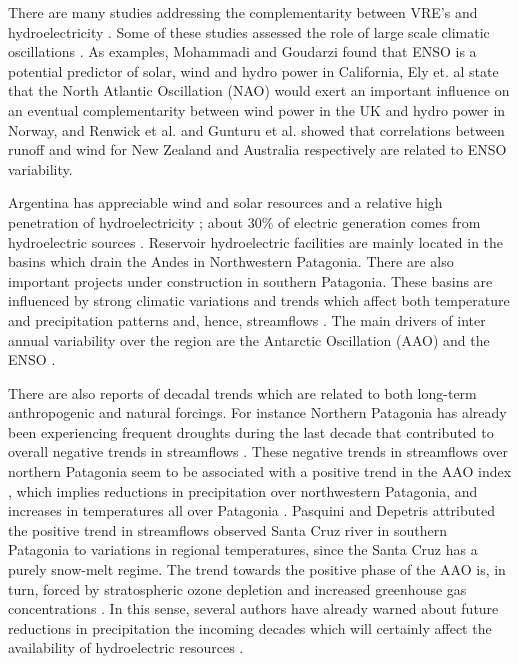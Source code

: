 \documentclass[AMA,Times1COL]{WileyNJDv5} %
\begin{document}
\begin{linenumbers}
There are many studies addressing the complementarity between VRE's and hydroelectricity \cite{rego2016positive, barbosa2017hydro, jurasz2020review, ciria2020multi}. Some of these studies assessed the role of large scale climatic oscillations  \cite{pozo2011impact,gunturu2017asynchrony, franccois2016influence}. As examples, Mohammadi and Goudarzi \cite{mohammadi2018study} found that ENSO is a potential predictor of solar, wind and hydro power in California, Ely et. al \cite{ely2013implications} state that the North Atlantic Oscillation (NAO) would exert an important influence on an eventual complementarity between wind power in the UK and hydro power in Norway, and Renwick et al. and Gunturu et al. \cite{renwick2010effects, gunturu2017asynchrony} showed that correlations between runoff and wind for New Zealand and Australia respectively are related to ENSO variability.

Argentina has appreciable wind and solar resources and a relative high penetration of hydroelectricity \cite{de2007renewable, lu2017global}; about 30\% of electric generation comes from hydroelectric sources \cite{barbosa2017hydro}. Reservoir hydroelectric facilities are mainly located in the basins which drain the Andes in Northwestern Patagonia. There are also important projects under construction in southern Patagonia. These basins are influenced by strong climatic variations and trends which affect both temperature and precipitation patterns and, hence, streamflows \cite{seoane2007assessing, garreaud2009present, gonzalez2010statistical, garreaud2013large}. The main drivers of inter annual variability over the region are the Antarctic Oscillation (AAO) and the ENSO \cite{garreaud2009present, garreaud2009andes}. 

There are also reports of decadal trends which are related to both long-term anthropogenic and natural forcings. For instance Northern Patagonia has already been experiencing frequent droughts during the last decade \cite{garreaud2020central, aguayo2021hydrological} that contributed to overall negative trends in streamflows \cite{pasquini2007discharge, rivera2018regional, rivera2018spatio}. These negative trends in streamflows over northern Patagonia seem to be associated with a positive trend in the AAO index \cite{garreaud2018record, rivera2018regional}, which implies reductions in precipitation over northwestern Patagonia, and increases in temperatures all over Patagonia \cite{silvestri2003antarctic, garreaud2009present}. Pasquini and Depetris \cite{pasquini2007discharge} attributed the positive trend in streamflows observed Santa Cruz river in southern Patagonia to variations in regional temperatures, since the Santa Cruz has a purely snow-melt regime. The trend towards the positive phase of the AAO is, in turn, forced by stratospheric ozone depletion and increased greenhouse gas concentrations \cite{arblaster2006contributions, mindlin2020storyline,villamayor2021causes}. In this sense, several authors have already warned about future reductions in precipitation the incoming decades which will certainly affect the availability of hydroelectric resources \cite{vera2006climate, nunez2009regional,natalia2020climate, nadal2017planificacion}.


\end{linenumbers}
\end{document}
